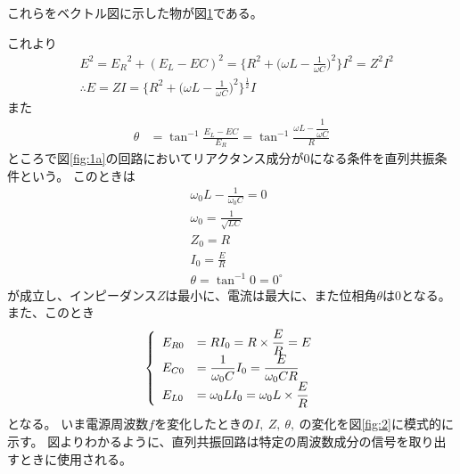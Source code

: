 \documentclass[11pt,a4paper,fleqn]{jsarticle}
\begin{document}
これらをベクトル図に示した物が図\ref{fig:1b}である。
\begin{figure}[h]
\label{fig:1b}
\end{figure}
これより
\begin{align}
&E^{2}={E_{R}}^{2}+(E_{L}-E{C})^{2}=\Biggl\{R^{2}+\biggl(\omega L-\frac{1}{\omega C}\biggr)^{2}\Biggr\}I^{2}=Z^{2}I^{2}\nonumber\\
&\therefore E=ZI=\Biggl\{R^{2}+\biggl(\omega L-\frac{1}{\omega C}\biggr)^{2}\Biggr\}^{\frac{1}{2}}I
\end{align}
また
\begin{eqnarray}
\theta &=\tan ^{-1}\frac{E_{L}-E{C}}{E_{R}}=\tan ^{-1}\frac{\omega L-\dfrac{1}{\omega C}}{R}
\end{eqnarray}
ところで図\ref{fig:1a}の回路においてリアクタンス成分が0になる条件を直列共振条件という。
このときは
\begin{align}
&\omega _{0}L-\frac{1}{\omega _{0}C}=0\\
&\omega_{0}=\frac{1}{\sqrt{LC}}\\
&Z_{0}=R\\
&I_{0}=\frac{E}{R}\\
&\theta =\tan^{-1}0=0^\circ
\end{align}
が成立し、インピーダンス$Z$は最小に、電流は最大に、また位相角$\theta$は0となる。
また、このとき
\begin{align}
\left\{\vbox to 24pt{} \begin{array}{ll}
E_{R0}&=RI_{0}=R\times\dfrac{E}{R}=E\\
E_{C0}&=\dfrac{1}{\omega_{0}C}I_{0}=\dfrac{E}{\omega_{0}CR}\\
E_{L0}&=\omega_{0}LI_{0}=\omega_{0}L\times\dfrac{E}{R}
\end{array} \right.
\end{align}
となる。
いま電源周波数$f$を変化したときの$I,\ Z,\ \theta,\ $の変化を図\ref{fig:2}に模式的に示す。
図よりわかるように、直列共振回路は特定の周波数成分の信号を取り出すときに使用される。
\end{document}
